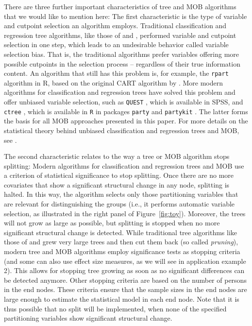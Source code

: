 \documentclass[doc,floatsintext,natbib]{apa7}
\begin{document}
There are three further important characteristics of tree and MOB algorithms that we would like to mention here: The first characteristic is the type of variable and cutpoint selection an algorithm employs. Traditional classification and regression tree algorithms, like those of \citet{Breetal:1984} and \citet{Qui:1993}, performed variable and cutpoint selection in one step, which leads to an undesirable behavior called variable selection bias. That is, the traditional algorithms prefer variables offering more possible cutpoints in the selection process -- regardless of their true information content. An algorithm that still has this problem is, for example, the \texttt{rpart} algorithm in R, based on the original CART algorithm by \citet{Breetal:1984}. More modern algorithms for classification and regression trees have solved this problem and offer unbiased variable selection, such as \texttt{QUEST} \citep{LohShi:1997}, which is available in SPSS, and \texttt{ctree} \citep{Hotetal:2006}, which is available in \texttt{R} in packages \texttt{party} and \texttt{partykit} \citep{partykit:pkg}. The latter forms the basis for all MOB approaches presented in this paper. For more details on the statistical theory behind unbiased classification and regression trees and MOB, see \citet{Hotetal:2006,StrMalTut:2009:PM,StroyKopf15}.  

The second characteristic relates to the way a tree or MOB algorithm stops splitting: Modern algorithms for classification and regression trees and MOB use a criterion of statistical significance to stop splitting. Once there are no more covariates that show a significant structural change in any node, splitting is halted. In this way, the  algorithm selects only those partitioning variables that are relevant for distinguishing the groups (i.e., it performs automatic variable selection, as illustrated in the right panel of Figure~\ref{fig:toy}). Moreover, the trees will not grow as large as possible, but splitting is stopped when no more significant structural change is detected. While traditional tree algorithms like those of \citet{Breetal:1984} and \citet{Qui:1993} grew very large trees and then cut them back (so called \textit{pruning}), modern tree and MOB algorithms employ significance tests as stopping criteria (and some can also use effect size measures, as we will see in application example 2). This allows for stopping tree growing as soon as no significant differences can be detected anymore. Other stopping criteria are based on the number of persons in the end nodes. These criteria ensure that the sample sizes in the end nodes are large enough to estimate the statistical model in each end node.  Note that it is thus possible that no split will be implemented, when none of the specified partitioning variables show significant structural change. 
\end{document}
